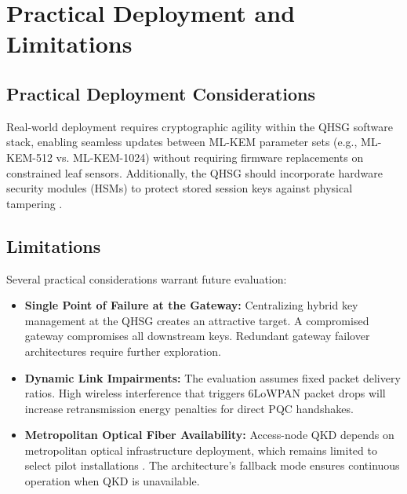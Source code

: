 \documentclass[journal]{IEEEtran}
\begin{document}

\section{Practical Deployment and Limitations}

\subsection{Practical Deployment Considerations}
Real-world deployment requires cryptographic agility within the QHSG software stack, enabling
seamless updates between ML-KEM parameter sets (e.g., ML-KEM-512 vs. ML-KEM-1024) without
requiring firmware replacements on constrained leaf sensors. Additionally, the QHSG should
incorporate hardware security modules (HSMs) to protect stored session keys against physical
tampering \cite{alrawi2019sok}.

\subsection{Limitations}
Several practical considerations warrant future evaluation:
\begin{itemize}
    \item \textbf{Single Point of Failure at the Gateway:} Centralizing hybrid key management
    at the QHSG creates an attractive target. A compromised gateway compromises all downstream
    keys. Redundant gateway failover architectures require further exploration.
    \item \textbf{Dynamic Link Impairments:} The evaluation assumes fixed packet delivery
    ratios. High wireless interference that triggers 6LoWPAN packet drops will increase
    retransmission energy penalties for direct PQC handshakes.
    \item \textbf{Metropolitan Optical Fiber Availability:} Access-node QKD depends on
    metropolitan optical infrastructure deployment, which remains limited to select pilot
    installations \cite{cao2022quantum}. The architecture's fallback mode ensures continuous
    operation when QKD is unavailable.
\end{itemize}

\end{document}
